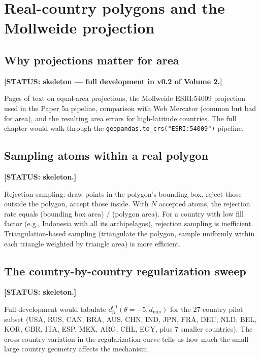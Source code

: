\documentclass[11pt,letterpaper,oneside]{book}
\theoremstyle{definition}
\theoremstyle{remark}
\newcommand{\eff}{\mathrm{eff}}
\begin{document}
\chapter{Real-country polygons and the Mollweide projection}
\label{ch:mollweide}

\section{Why projections matter for area}

\textbf{[STATUS: skeleton — full development in v0.2 of Volume 2.]}

Pages of text on equal-area projections, the Mollweide ESRI:54009
projection used in the Paper 5a pipeline, comparison with Web Mercator
(common but bad for area), and the resulting area errors for
high-latitude countries. The full chapter would walk through the
\texttt{geopandas.to\_crs("ESRI:54009")} pipeline.

\section{Sampling atoms within a real polygon}

\textbf{[STATUS: skeleton.]}

Rejection sampling: draw points in the polygon's bounding box, reject
those outside the polygon, accept those inside. With $N$ accepted atoms,
the rejection rate equals (bounding box area) / (polygon area). For a
country with low fill factor (e.g., Indonesia with all its archipelagos),
rejection sampling is inefficient. Triangulation-based sampling
(triangulate the polygon, sample uniformly within each triangle weighted
by triangle area) is more efficient.

\section{The country-by-country regularization sweep}

\textbf{[STATUS: skeleton.]}

Full development would tabulate $d_{ii}^{\eff}(\theta = -5, d_{\min})$
for the 27-country pilot subset (USA, RUS, CAN, BRA, AUS, CHN, IND, JPN,
FRA, DEU, NLD, BEL, KOR, GBR, ITA, ESP, MEX, ARG, CHL, EGY, plus 7
smaller countries). The cross-country variation in the regularization
curve tells us how much the small-large country geometry affects the
mechanism.

\end{document}
